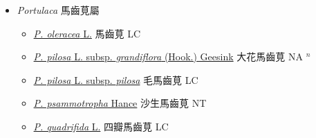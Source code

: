 
  \begin{itemize}
 \item[] \textit{Portulaca} 馬齒莧屬
                    
  \begin{itemize}
        \item[] \href{http://www.theplantlist.org/tpl1.1/search?q=Portulaca+oleracea}{\textit{P. oleracea} L.}   馬齒莧 LC
        \item[] \href{http://www.theplantlist.org/tpl1.1/search?q=Portulaca+pilosa+subsp.+grandiflora}{\textit{P. pilosa} L. subsp. \textit{grandiflora} (Hook.) Geesink}   大花馬齒莧 NA $^n$
        \item[] \href{http://www.theplantlist.org/tpl1.1/search?q=Portulaca+pilosa+subsp.+pilosa}{\textit{P. pilosa} L. subsp. \textit{pilosa}}   毛馬齒莧 LC
        \item[] \href{http://www.theplantlist.org/tpl1.1/search?q=Portulaca+psammotropha}{\textit{P. psammotropha} Hance}   沙生馬齒莧 NT
        \item[] \href{http://www.theplantlist.org/tpl1.1/search?q=Portulaca+quadrifida}{\textit{P. quadrifida} L.}   四瓣馬齒莧 LC
  \end{itemize}
  \end{itemize}
